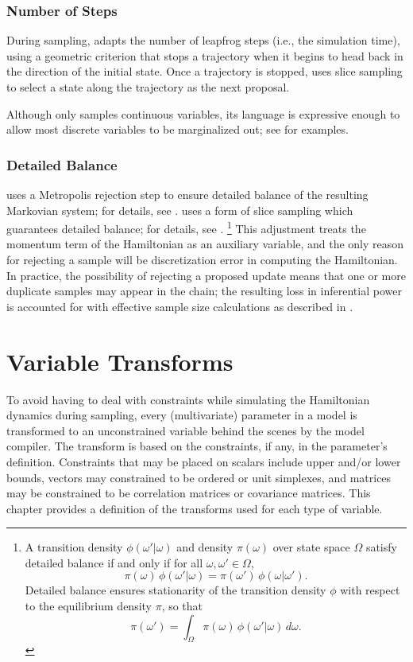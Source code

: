 \subsection{Number of Steps}

During sampling, \NUTS adapts the number of leapfrog steps (i.e., the
simulation time), using a geometric criterion that stops a trajectory
when it begins to head back in the direction of the initial state.
Once a trajectory is stopped, \NUTS uses slice sampling to select a
state along the trajectory as the next proposal.

Although \Stan only samples continuous variables, its language is
expressive enough to allow most discrete variables to be marginalized
out; see  for examples.

\subsection{Detailed Balance}

\HMC uses a Metropolis rejection step to ensure detailed balance of
the resulting Markovian system; for details, see \citep{Neal:2011}.
\NUTS uses a form of slice sampling which guarantees detailed balance;
for details, see \citep{Hoffman-Gelman:2012}.%
%
\footnote{A transition density $\phi(\omega'|\omega)$ and density
  $\pi(\omega)$ over state space $\Omega$ satisfy detailed balance if
  and only if for all $\omega, \omega' \in \Omega$,
\[
\pi(\omega) \, \phi(\omega'|\omega)
=
\pi(\omega') \, \phi(\omega | \omega').
\]
Detailed balance ensures stationarity of the transition density $\phi$
with respect to the equilibrium density $\pi$, so that
\[
\pi(\omega') = \int_{\Omega} \pi(\omega) \, \phi(\omega'|\omega) \, d\omega.
\]
} 
%
This adjustment treats the momentum term of the Hamiltonian as an
auxiliary variable, and the only reason for rejecting a sample will be
discretization error in computing the Hamiltonian.  In practice, the
possibility of rejecting a proposed update means that one or more
duplicate samples may appear in the chain; the resulting loss in
inferential power is accounted for with effective sample size
calculations as described in .


\chapter{Variable Transforms}\label{variable-transforms.chapter}

\noindent
To avoid having to deal with constraints while simulating the
Hamiltonian dynamics during sampling, every (multivariate) parameter
in a \Stan model is transformed to an unconstrained variable behind
the scenes by the model compiler.  The transform is based on the
constraints, if any, in the parameter's definition.  Constraints that
may be placed on scalars include upper and/or lower bounds, vectors
may constrained to be ordered or unit simplexes, and matrices may be
constrained to be correlation matrices or covariance matrices.  This
chapter provides a definition of the transforms used for each type of
variable.

